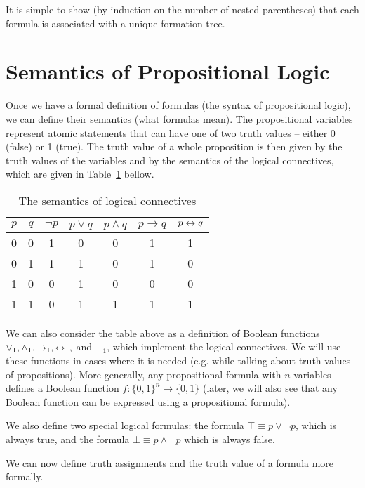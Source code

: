 It is simple to show (by induction on the number of nested parentheses) that each formula is associated with a unique formation tree. 

\section{Semantics of Propositional Logic}

Once we have a formal definition of formulas (the syntax of propositional logic), we can define their semantics (what formulas mean). The propositional variables represent atomic statements that can have one of two truth values -- either 0 (false) or 1 (true). The truth value of a whole proposition is then given by the truth values of the variables and by the semantics of the logical connectives, which are given in Table~\ref{tab:prop_semantics} bellow.

\begin{table}[h]
\centering
\caption{The semantics of logical connectives}
\label{tab:prop_semantics}
\begin{tabular}{cc|ccccc}
\toprule
$p$ & $q$ & $\neg p$ & $p \lor q$ & $p \land q$ & $p \to q$ & $p \leftrightarrow q$ \\
\midrule
0 & 0 & 1 & 0 & 0 & 1 & 1 \\
0 & 1 & 1 & 1 & 0 & 1 & 0 \\
1 & 0 & 0 & 1 & 0 & 0 & 0 \\
1 & 1 & 0 & 1 & 1 & 1 & 1 \\
\bottomrule
\end{tabular}
\end{table}

We can also consider the table above as a definition of Boolean functions $\lor_1, \land_1, \to_1, \leftrightarrow_1,$ and $-_1$, which implement the logical connectives. We will use these functions in cases where it is needed (e.g. while talking about truth values of propositions). More generally, any propositional formula with $n$ variables defines a Boolean function $f: \{0,1\}^n \to \{0,1\}$ (later, we will also see that any Boolean function can be expressed using a propositional formula).

We also define two special logical formulas: the formula $\top \equiv p \lor \neg p$, which is always true, and the formula $\bot \equiv p \land \neg p$ which is always false.

We can now define truth assignments and the truth value of a formula more formally.

